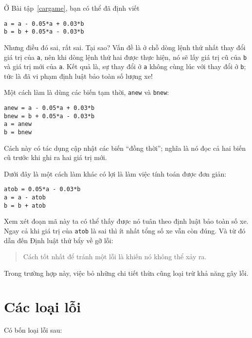 \documentclass[12pt]{book}
\begin{document}
Ở Bài tập~\ref{cargame}, bạn có thể đã định viết

\begin{verbatim}
a = a - 0.05*a + 0.03*b
b = b + 0.05*a - 0.03*b
\end{verbatim}
%
Nhưng điều đó sai, rất sai. Tại sao? Vấn đề là ở chỗ dòng lệnh 
thứ nhất thay đổi giá trị của {\tt a}, nên khi dòng lệnh thứ hai 
được thực hiện, nó sẽ lấy giá trị cũ của {\tt b} và giá trị mới của
{\tt a}. Kết quả là, sự thay đổi ở {\tt a} không cùng lúc với thay
đổi ở {\tt b}; tức là đã vi phạm định luật bảo toàn số lượng xe!

Một cách làm là dùng các biến tạm thời, {\tt anew} và {\tt bnew}:

\begin{verbatim}
anew = a - 0.05*a + 0.03*b
bnew = b + 0.05*a - 0.03*b
a = anew
b = bnew
\end{verbatim}
%
Cách này có tác dụng cập nhật các biến ``đồng thời''; nghĩa là
nó đọc cả hai biến cũ trước khi ghi ra hai giá trị mới.

Dưới đây là một cách làm khác có lợi là làm việc tính toán được
đơn giản:

\begin{verbatim}
atob = 0.05*a - 0.03*b
a = a - atob
b = b + atob
\end{verbatim}
%
Xem xét đoạn mã này ta có thể thấy được nó tuân theo định luật
bảo toàn số xe. Ngay cả khi giá trị của {\tt atob} là sai thì ít nhất 
tổng số xe vẫn còn đúng. Và từ đó dẫn đến Định luật thứ bẩy về
gỡ lỗi:

\begin{quote}
Cách tốt nhất để tránh một lỗi là khiến nó không thể xảy ra.
\end{quote}

Trong trường hợp này, việc bỏ những chi tiết thừa cũng loại trừ 
khả năng gây lỗi.


\section{Các loại lỗi}

Có bốn loại lỗi sau:
\end{document}
